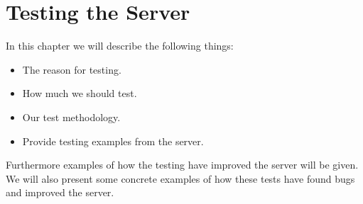 \chapter{Testing the Server}\label{cha:testing}
In this chapter we will describe the following things:
\begin{itemize}
    \item The reason for testing.
    \item How much we should test.
    \item Our test methodology.
    \item Provide testing examples from the server.
\end{itemize}

Furthermore examples of how the testing have improved the server will be given.
We will also present some concrete examples of how these tests have found bugs and improved the server.

